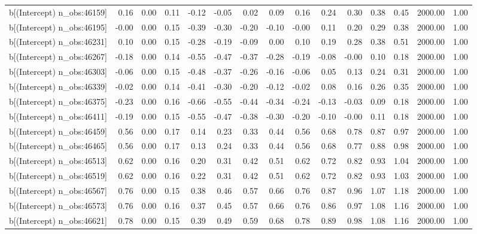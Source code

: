 \begin{table}[ht]
\begin{tabular}{rrrrrrrrrrrrrrr}
  b[(Intercept) n\_obs:46159] & 0.16 & 0.00 & 0.11 & -0.12 & -0.05 & 0.02 & 0.09 & 0.16 & 0.24 & 0.30 & 0.38 & 0.45 & 2000.00 & 1.00 \\ 
  b[(Intercept) n\_obs:46195] & -0.00 & 0.00 & 0.15 & -0.39 & -0.30 & -0.20 & -0.10 & -0.00 & 0.11 & 0.20 & 0.29 & 0.38 & 2000.00 & 1.00 \\ 
  b[(Intercept) n\_obs:46231] & 0.10 & 0.00 & 0.15 & -0.28 & -0.19 & -0.09 & 0.00 & 0.10 & 0.19 & 0.28 & 0.38 & 0.51 & 2000.00 & 1.00 \\ 
  b[(Intercept) n\_obs:46267] & -0.18 & 0.00 & 0.14 & -0.55 & -0.47 & -0.37 & -0.28 & -0.19 & -0.08 & -0.00 & 0.10 & 0.18 & 2000.00 & 1.00 \\ 
  b[(Intercept) n\_obs:46303] & -0.06 & 0.00 & 0.15 & -0.48 & -0.37 & -0.26 & -0.16 & -0.06 & 0.05 & 0.13 & 0.24 & 0.31 & 2000.00 & 1.00 \\ 
  b[(Intercept) n\_obs:46339] & -0.02 & 0.00 & 0.14 & -0.41 & -0.30 & -0.20 & -0.12 & -0.02 & 0.08 & 0.16 & 0.26 & 0.35 & 2000.00 & 1.00 \\ 
  b[(Intercept) n\_obs:46375] & -0.23 & 0.00 & 0.16 & -0.66 & -0.55 & -0.44 & -0.34 & -0.24 & -0.13 & -0.03 & 0.09 & 0.18 & 2000.00 & 1.00 \\ 
  b[(Intercept) n\_obs:46411] & -0.19 & 0.00 & 0.15 & -0.55 & -0.47 & -0.38 & -0.30 & -0.20 & -0.10 & -0.00 & 0.11 & 0.18 & 2000.00 & 1.00 \\ 
  b[(Intercept) n\_obs:46459] & 0.56 & 0.00 & 0.17 & 0.14 & 0.23 & 0.33 & 0.44 & 0.56 & 0.68 & 0.78 & 0.87 & 0.97 & 2000.00 & 1.00 \\ 
  b[(Intercept) n\_obs:46465] & 0.56 & 0.00 & 0.17 & 0.13 & 0.24 & 0.33 & 0.44 & 0.56 & 0.68 & 0.77 & 0.88 & 0.98 & 2000.00 & 1.00 \\ 
  b[(Intercept) n\_obs:46513] & 0.62 & 0.00 & 0.16 & 0.20 & 0.31 & 0.42 & 0.51 & 0.62 & 0.72 & 0.82 & 0.93 & 1.04 & 2000.00 & 1.00 \\ 
  b[(Intercept) n\_obs:46519] & 0.62 & 0.00 & 0.16 & 0.22 & 0.31 & 0.42 & 0.51 & 0.62 & 0.72 & 0.82 & 0.93 & 1.03 & 2000.00 & 1.00 \\ 
  b[(Intercept) n\_obs:46567] & 0.76 & 0.00 & 0.15 & 0.38 & 0.46 & 0.57 & 0.66 & 0.76 & 0.87 & 0.96 & 1.07 & 1.18 & 2000.00 & 1.00 \\ 
  b[(Intercept) n\_obs:46573] & 0.76 & 0.00 & 0.16 & 0.37 & 0.45 & 0.57 & 0.66 & 0.76 & 0.86 & 0.97 & 1.08 & 1.16 & 2000.00 & 1.00 \\ 
  b[(Intercept) n\_obs:46621] & 0.78 & 0.00 & 0.15 & 0.39 & 0.49 & 0.59 & 0.68 & 0.78 & 0.89 & 0.98 & 1.08 & 1.16 & 2000.00 & 1.00 \\ 

\end{tabular}
\end{table}
